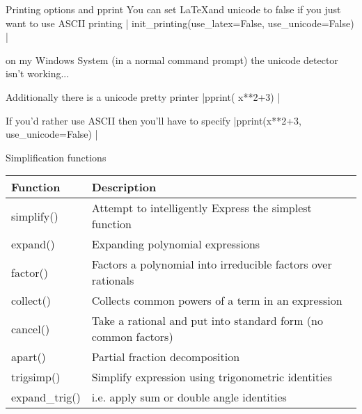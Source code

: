 \documentclass[10pt]{beamer}
\begin{document}
\begin{frame}[fragile]{Printing options and pprint}
You can set \LaTeX and unicode to false if you just want to use ASCII printing
| init_printing(use_latex=False, use_unicode=False) |

on my Windows System (in a normal command prompt) the unicode detector isn't working...

Additionally there is a unicode pretty printer
|pprint( x**2+3) |

If you'd rather use ASCII then you'll have to specify
|pprint(x**2+3, use_unicode=False) |
\end{frame}


\begin{frame}[fragile]{Simplification functions}
\begin{table}
\begin{tabular}{ll}
\textbf{Function} & \textbf{Description}  \\
\hline
simplify()  & Attempt to intelligently Express the simplest function  \\
expand()  & Expanding polynomial expressions \\
factor()  & Factors a polynomial into irreducible factors over rationals \\
collect() & Collects common powers of a term in an expression \\
cancel() & Take a rational and put into standard form (no common factors) \\
apart() & Partial fraction decomposition \\
trigsimp() & Simplify expression using trigonometric identities \\
expand\_trig() & i.e. apply sum or double angle identities \\
\end{tabular}
\end{table}
\end{frame}

\end{document}

